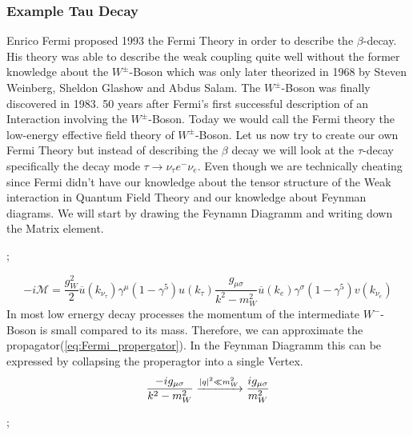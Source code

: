 \documentclass[../Bachelorarbeit.tex]{subfiles}
\begin{document}
\subsubsection{Example Tau Decay}
Enrico Fermi proposed 1993 the Fermi Theory in order to describe the $\beta$-decay. His theory was able to describe the
weak coupling quite well without the former knowledge about the $W^{\pm}$-Boson which was only later theorized in 1968 by Steven Weinberg, Sheldon Glashow and Abdus Salam.
The $W^{\pm}$-Boson was finally discovered in 1983. 50 years after Fermi's first successful description of an Interaction involving the $W^{\pm}$-Boson.
Today we would call the Fermi theory the low-energy effective field theory of $W^{\pm}$-Boson.
Let us now try to create our own Fermi Theory but instead of describing the $\beta$ decay we will look at the $\tau$-decay specifically the decay mode $\tau \rightarrow \nu_{\tau}e^{-}\nu_{e}$.
Even though we are technically cheating since Fermi didn't have our knowledge about the tensor structure of the Weak interaction in Quantum Field Theory and our knowledge about Feynman diagrams.
We will start by drawing the Feynamn Diagramm and writing down the Matrix element.
\begin{center}
    ;
\end{center}
\begin{equation}
    -i\mathcal{M}=\frac{g_{W}^{2}}{2} \overline{u}(k_{\nu_{\tau}})\gamma^{\mu}(1-\gamma^{5})u(k_{\tau}) \frac{g_{\mu\sigma}}{k^{2}-m_{W}^{2}} \overline{u}(k_{e})\gamma^{\sigma}(1-\gamma^{5})v(k_{\nu_{e}})
\end{equation}
In most low ernergy decay processes the momentum of the intermediate $W^{-}$-Boson is small compared to its mass. Therefore, we can approximate the
propagator(\ref{eq:Fermi_propergator}). In the Feynman Diagramm this can be expressed by collapsing the properagtor into a single Vertex.
\begin{equation}
    \frac{-ig_{\mu\sigma}}{k^{2}-m_{W}^{2}} \xrightarrow{\abs{q}^{2} \ll m_{W}^{2}} \frac{ig_{\mu\sigma}}{m_{W}^{2}} 
    \label{eq:Fermi_propergator}
\end{equation}

\begin{center}
        ;
\end{center}
\end{document}
